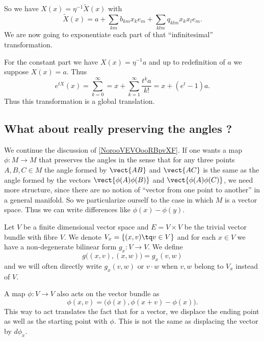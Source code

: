 So we have \( X(x)=\eta^{-1}\tilde X(x)\) with
\begin{equation}
    \tilde X(x)=a+\sum_{km}b_{km}x_ke_m+\sum_{klm}q_{klm}x_kx_le_m.
\end{equation}
We are now going to exponentiate each part of that ``infinitesimal'' transformation.

For the constant part we have \( X(x)=\eta^{-1} a\) and up to redefinition of \( a\) we suppose \( X(x)=a\). Thus
\begin{equation}
    e^{tX}(x)=\sum_{k=0}^{\infty}=x+\sum_{k=1}^{\infty}\frac{ t^ka }{ k! }=x+(e^t-1)a.
\end{equation}
Thus this transformation is a global translation.


\subsection{What about really preserving the angles ?}
\label{sebsecooCBKEooQOWqFo}

We continue the discussion of \ref{NorooVEVOooRBpvXF}. If one wants a map \( \phi\colon M\to M\) that preserves the angles in the sense that for any three points \( A,B,C\in M\) the angle formed by \( \vect{ AB }\) and \( \vect{ AC }\) is the same as the angle formed by the vectors \( \vect{ \phi(A)\phi(B) }\) and \( \vect{ \phi(A)\phi(C) }\), we need more structure, since there are no notion of ``vector from one point to another'' in a general manifold. So we particularize ourself to the case in which \( M\) is a vector space. Thus we can write differences like \( \phi(x)-\phi(y)\).

Let \( V\) be a finite dimensional vector space and \( E=V\times V\) be the trivial vector bundle with fibre \( V\). We denote \( V_x=\{ (x,v)\tq v\in V \}\) and for each \( x\in V\) we have a non-degenerate bilinear form \( g_x\colon V\to V\). We define
\begin{equation}
    g\big( (x,v),(x,w) \big)=g_x(v,w)
\end{equation}
and we will often directly write \( g_x(v,w)\) or \( v\cdot w\) when \( v,w\) belong to \(V_x\) instead of \( V\).

A map \( \phi\colon V\to V\) also acts on the vector bundle as
\begin{equation}        \label{EQooFICEooQACFoU}
    \phi(x,v)=\big( \phi(x),\phi(x+v)-\phi(x) \big).
\end{equation}
This way to act translates the fact that for a vector, we displace the ending point as well as the starting point with \( \phi\). This is not the same as displacing the vector by \( d\phi_x\).

